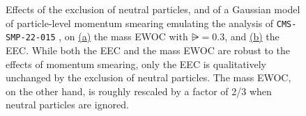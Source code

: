 \begin{figure}[t!]
    \centering
    \caption[Effects of the exclusion of neutral particles, and of a Gaussian model of particle-level momentum smearing emulating CMS analyses, on the mass EWOC and the EEC.]{
        Effects of the exclusion of neutral particles, and of a Gaussian model of particle-level momentum smearing emulating the analysis of \texttt{CMS-SMP-22-015} \cite{CMS:2024mlf}, on
        \hyperref[fig:m_ewoc:rsub_3:smearing]{(a)}
        the mass EWOC with \(\rsub=0.3\), and
        \hyperref[fig:eec:smearing]{(b)}
        the EEC.
        While both the EEC and the mass EWOC are robust to the effects of momentum smearing, only the EEC is qualitatively unchanged by the exclusion of neutral particles.
        The mass EWOC, on the other hand, is roughly rescaled by a factor of 2/3 when neutral particles are ignored.
    }
    \label{fig:pp_to_ww:14TeV:smearing}
\end{figure}


